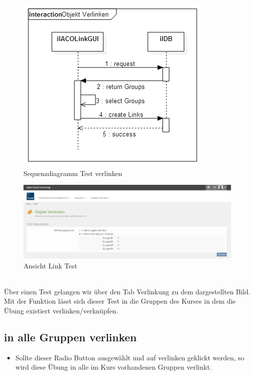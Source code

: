 \begin{figure}[h!]
	\centering
	\includegraphics[width=.7\textwidth]{img/seq_linkGUI.png}
	\caption{Sequenzdiagramm Test verlinken}
\end{figure}
\begin{figure}[h!]
	\centering
	\includegraphics[width=1\textwidth]{img/linkTest.png}
	\caption{Ansicht Link Test}
\end{figure}

~\\Über einen Test gelangen wir über den Tab Verlinkung zu dem dargestellten Bild. 
Mit der Funktion lässt sich dieser Test in die Gruppen des Kurses in dem die Übung existiert verlinken/verknüpfen. 

\newpage

\subsection*{in alle Gruppen verlinken}
\begin{itemize}
	\item Sollte dieser Radio Button ausgewählt und auf verlinken geklickt werden, so wird diese Übung in alle im Kurs vorhandenen Gruppen verlinkt. 
\end{itemize}

